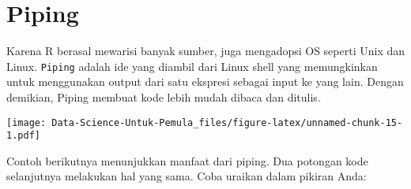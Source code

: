\documentclass[
]{book}
\newenvironment{Shaded}{\begin{snugshade}}{\end{snugshade}}
\newcommand{\CommentTok}[1]{\textcolor[rgb]{0.56,0.35,0.01}{\textit{#1}}}
\newcommand{\DataTypeTok}[1]{\textcolor[rgb]{0.13,0.29,0.53}{#1}}
\newcommand{\DecValTok}[1]{\textcolor[rgb]{0.00,0.00,0.81}{#1}}
\newcommand{\FloatTok}[1]{\textcolor[rgb]{0.00,0.00,0.81}{#1}}
\newcommand{\KeywordTok}[1]{\textcolor[rgb]{0.13,0.29,0.53}{\textbf{#1}}}
\newcommand{\NormalTok}[1]{#1}
\newcommand{\OperatorTok}[1]{\textcolor[rgb]{0.81,0.36,0.00}{\textbf{#1}}}
\newcommand{\StringTok}[1]{\textcolor[rgb]{0.31,0.60,0.02}{#1}}
\begin{document}
\hypertarget{piping}{%
\section{Piping}\label{piping}}

Karena R berasal mewarisi banyak sumber, juga mengadopsi OS seperti Unix dan Linux. \texttt{Piping} adalah ide yang diambil dari Linux shell yang memungkinkan untuk menggunakan output dari satu ekspresi sebagai input ke yang lain. Dengan demikian, Piping membuat kode lebih mudah dibaca dan ditulis.

\begin{Shaded}
\end{Shaded}

\texttt{[image: Data-Science-Untuk-Pemula\_files/figure-latex/unnamed-chunk-15-1.pdf]}

\begin{Shaded}
\end{Shaded}

Contoh berikutnya menunjukkan manfaat dari piping. Dua potongan kode selanjutnya melakukan hal yang sama. Coba uraikan dalam pikiran Anda:
\end{document}
